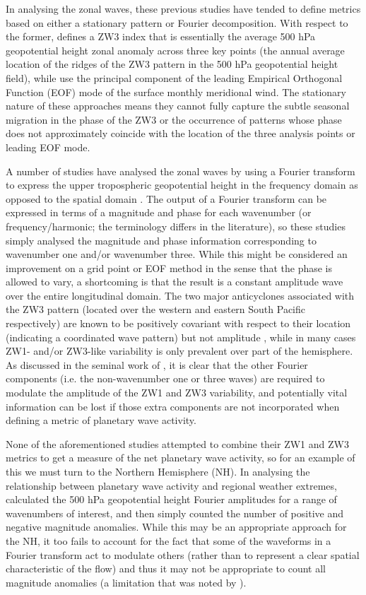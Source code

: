 In analysing the zonal waves, these previous studies have tended to define metrics based on either a stationary pattern or Fourier decomposition. With respect to the former, \citet{Raphael2004} defines a ZW3 index that is essentially the average 500 hPa geopotential height zonal anomaly across three key points (the annual average location of the ridges of the ZW3 pattern in the 500 hPa geopotential height field), while \citet{Yuan2008} use the principal component of the leading Empirical Orthogonal Function (EOF) mode of the surface monthly meridional wind. The stationary nature of these approaches means they cannot fully capture the subtle seasonal migration in the phase of the ZW3 \citep[approximately 15 degrees of longitude on average; e.g.][]{vanLoon1984,Mo1985} or the occurrence of patterns whose phase does not approximately coincide with the location of the three analysis points or leading EOF mode.

A number of studies have analysed the zonal waves by using a Fourier transform to express the upper tropospheric geopotential height in the frequency domain as opposed to the spatial domain \citep{Hobbs2007,Hobbs2010,Turner2013}. The output of a Fourier transform can be expressed in terms of a magnitude and phase for each wavenumber (or frequency/harmonic; the terminology differs in the literature), so these studies simply analysed the magnitude and phase information corresponding to wavenumber one and/or wavenumber three. While this might be considered an improvement on a grid point or EOF method in the sense that the phase is allowed to vary, a shortcoming is that the result is a constant amplitude wave over the entire longitudinal domain. The two major anticyclones associated with the ZW3 pattern (located over the western and eastern South Pacific respectively) are known to be positively covariant with respect to their location (indicating a coordinated wave pattern) but not amplitude \citep{Hobbs2010}, while in many cases ZW1- and/or ZW3-like variability is only prevalent over part of the hemisphere. As discussed in the seminal work of \citet{vanLoon1972}, it is clear that the other Fourier components (i.e. the non-wavenumber one or three waves) are required to modulate the amplitude of the ZW1 and ZW3 variability, and potentially vital information can be lost if those extra components are not incorporated when defining a metric of planetary wave activity. 

None of the aforementioned studies attempted to combine their ZW1 and ZW3 metrics to get a measure of the net planetary wave activity, so for an example of this we must turn to the Northern Hemisphere (NH). In analysing the relationship between planetary wave activity and regional weather extremes, \citet{Screen2014} calculated the 500 hPa geopotential height Fourier amplitudes for a range of wavenumbers of interest, and then simply counted the number of positive and negative magnitude anomalies. While this may be an appropriate approach for the NH, it too fails to account for the fact that some of the waveforms in a Fourier transform act to modulate others (rather than to represent a clear spatial characteristic of the flow) and thus it may not be appropriate to count all magnitude anomalies (a limitation that was noted by \citet{Screen2014}).


